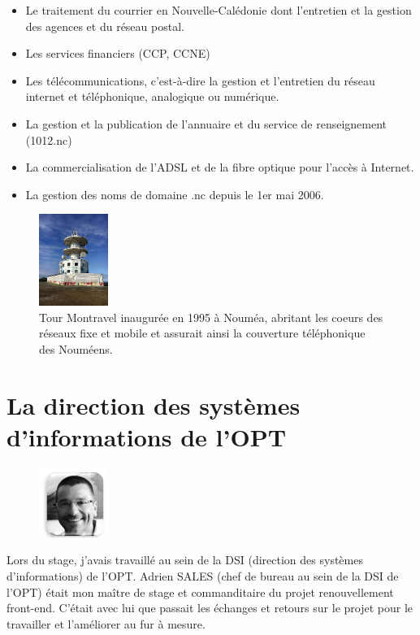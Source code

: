 \documentclass[12pt,a4paper]{report}
\begin{document}
\begin{itemize}
    \item Le traitement du courrier en Nouvelle-Calédonie dont l'entretien et la gestion des agences et du réseau postal.
    \item Les services financiers (CCP, CCNE)
    \item Les télécommunications, c'est-à-dire la gestion et l'entretien du réseau internet et téléphonique, analogique ou numérique.
    \item La gestion et la publication de l'annuaire et du service de renseignement (1012.nc)
    \item La commercialisation de l'ADSL et de la fibre optique pour l'accès à Internet.
    \item La gestion des noms de domaine .nc depuis le 1er mai 2006.
\end{itemize}
\begin{figure}[h] %
    \centering
    \includegraphics[width=0.2\textwidth]{ressources_rapport/tour_montravel.jpg}
    \caption{Tour Montravel inaugurée en 1995 à Nouméa, abritant les coeurs des réseaux fixe et mobile et assurait ainsi la couverture téléphonique des Nouméens.}
    \label{fig:exemple}
\end{figure}
\newpage

\section{La direction des systèmes d'informations de l'OPT}
\begin{figure}[h] %
    \centering
    \includegraphics[width=0.2\textwidth]{ressources_rapport/adrien_sales.jpg}
\end{figure}
Lors du stage, j'avais travaillé au sein de la DSI (direction des systèmes d'informations) de l'OPT. Adrien SALES (chef de bureau au sein de la DSI de l'OPT) était mon maître de stage et commanditaire du projet renouvellement front-end. C'était avec lui que passait les échanges et retours sur le projet pour le travailler et l'améliorer au fur à mesure.
\end{document}
